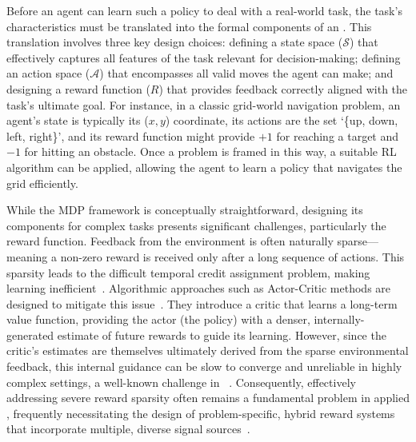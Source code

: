 Before an agent can learn such a policy to deal with a real-world task, the task's characteristics must be translated into the formal components of an \MDP{}. This translation involves three key design choices: defining a state space ($\mathcal{S}$) that effectively captures all features of the task relevant for decision-making; defining an action space ($\mathcal{A}$) that encompasses all valid moves the agent can make; and designing a reward function ($R$) that provides feedback correctly aligned with the task's ultimate goal. For instance, in a classic grid-world navigation problem, an agent's state is typically its ($x, y$) coordinate, its actions are the set `\{up, down, left, right\}', and its reward function might provide $+1$ for reaching a target and $-1$ for hitting an obstacle. Once a problem is framed in this way, a suitable RL algorithm can be applied, allowing the agent to learn a policy that navigates the grid efficiently.

While the MDP framework is conceptually straightforward, designing its components for complex tasks presents significant challenges, particularly the reward function. Feedback from the environment is often naturally sparse---meaning a non-zero reward is received only after a long sequence of actions. This sparsity leads to the difficult temporal credit assignment problem, making learning inefficient~\cite{sutton2018reinforcement}. Algorithmic approaches such as Actor-Critic methods are designed to mitigate this issue~\cite{mnih2016asynchronous}. They introduce a critic that learns a long-term value function, providing the actor (the policy) with a denser, internally-generated estimate of future rewards to guide its learning. However, since the critic's estimates are themselves ultimately derived from the sparse environmental feedback, this internal guidance can be slow to converge and unreliable in highly complex settings, a well-known challenge in \RL{}~\cite{fujimoto2018addressing}. Consequently, effectively addressing severe reward sparsity often remains a fundamental problem in applied \RL{}, frequently necessitating the design of problem-specific, hybrid reward systems that incorporate multiple, diverse signal sources~\cite{akkaya2019solving}.

